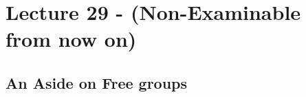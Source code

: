 \section{Lecture 29 - (Non-Examinable from now on)}
\subsection{An Aside on Free groups}





    
    
